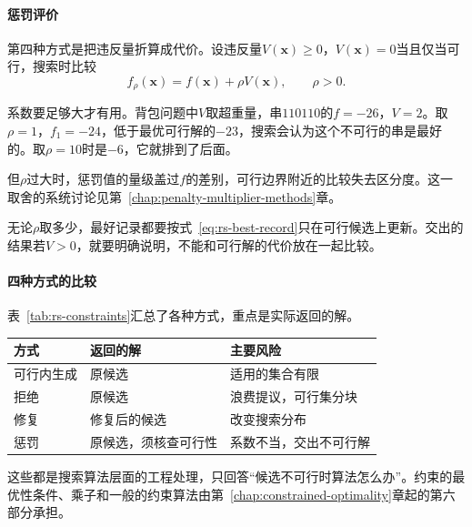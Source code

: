 \paragraph{惩罚评价}
第四种方式是把违反量折算成代价。设违反量$V(\bm{x})\geq0$，$V(\bm{x})=0$当且仅当可行，搜索时比较
\begin{equation}
 f_\rho(\bm{x})=f(\bm{x})+\rho V(\bm{x}),\qquad\rho>0.
 \label{eq:rs-penalty}
\end{equation}

系数要足够大才有用。背包问题中$V$取超重量，串$110110$的$f=-26$，$V=2$。取$\rho=1$，$f_1=-24$，低于最优可行解的$-23$，搜索会认为这个不可行的串是最好的。取$\rho=10$时是$-6$，它就排到了后面。

但$\rho$过大时，惩罚值的量级盖过$f$的差别，可行边界附近的比较失去区分度。这一取舍的系统讨论见第~\ref{chap:penalty-multiplier-methods}章。

无论$\rho$取多少，最好记录都要按式~\eqref{eq:rs-best-record}只在可行候选上更新。交出的结果若$V>0$，就要明确说明，不能和可行解的代价放在一起比较。

\paragraph{四种方式的比较}
表~\ref{tab:rs-constraints}汇总了各种方式，重点是实际返回的解。

\begin{BookInlineTable}
 \centering
 \caption{约束处理方式的比较。}
 \label{tab:rs-constraints}
 \begin{tabular}{lll}
  \toprule
  方式 & 返回的解 & 主要风险 \\
  \midrule
  可行内生成 & 原候选 & 适用的集合有限 \\
  拒绝 & 原候选 & 浪费提议，可行集分块 \\
  修复 & 修复后的候选 & 改变搜索分布 \\
  惩罚 & 原候选，须核查可行性 & 系数不当，交出不可行解 \\
  \bottomrule
 \end{tabular}
\end{BookInlineTable}

这些都是搜索算法层面的工程处理，只回答“候选不可行时算法怎么办”。约束的最优性条件、乘子和一般的约束算法由第~\ref{chap:constrained-optimality}章起的第六部分承担。
